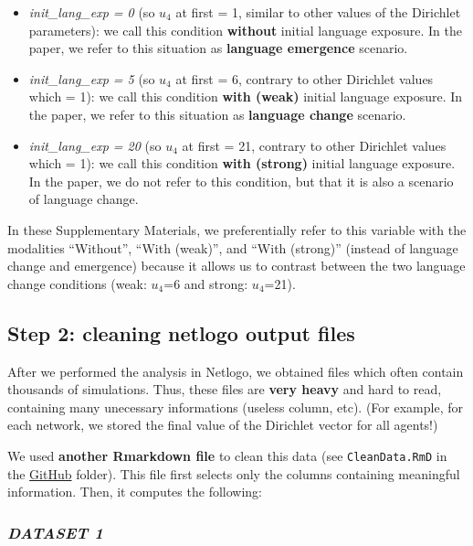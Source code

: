 \documentclass[
]{article}
\providecommand{\tightlist}{%
  \setlength{\itemsep}{0pt}\setlength{\parskip}{0pt}}
\begin{document}
\begin{itemize}
\tightlist
\item
  \emph{init\_lang\_exp = 0} (so \(u_4\) at first = 1, similar to other
  values of the Dirichlet parameters): we call this condition
  \textbf{without} initial language exposure. In the paper, we refer to
  this situation as \textbf{language emergence} scenario.
\item
  \emph{init\_lang\_exp = 5} (so \(u_4\) at first = 6, contrary to other
  Dirichlet values which = 1): we call this condition \textbf{with
  (weak)} initial language exposure. In the paper, we refer to this
  situation as \textbf{language change} scenario.
\item
  \emph{init\_lang\_exp = 20} (so \(u_4\) at first = 21, contrary to
  other Dirichlet values which = 1): we call this condition \textbf{with
  (strong)} initial language exposure. In the paper, we do not refer to
  this condition, but that it is also a scenario of language change.
\end{itemize}

In these Supplementary Materials, we preferentially refer to this
variable with the modalities ``Without'', ``With (weak)'', and ``With
(strong)'' (instead of language change and emergence) because it allows
us to contrast between the two language change conditions (weak:
\(u_4\)=6 and strong: \(u_4\)=21).

\hypertarget{step-2-cleaning-netlogo-output-files}{%
\subsection{Step 2: cleaning netlogo output
files}\label{step-2-cleaning-netlogo-output-files}}

After we performed the analysis in Netlogo, we obtained files which
often contain thousands of simulations. Thus, these files are
\textbf{very heavy} and hard to read, containing many unecessary
informations (useless column, etc). (For example, for each network, we
stored the final value of the Dirichlet vector for all agents!)

We used \textbf{another Rmarkdown file} to clean this data (see
\texttt{CleanData.RmD} in the
\href{https://github.com/mathjoss/NetworkStructure_ABM}{GitHub} folder).
This file first selects only the columns containing meaningful
information. Then, it computes the following:

\hypertarget{dataset-1}{%
\subsubsection{\texorpdfstring{\emph{DATASET
1}}{DATASET 1}}\label{dataset-1}}
\end{document}
